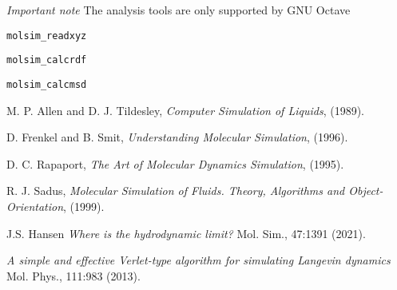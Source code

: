 \documentclass[11pt]{article}
\begin{document}
\textit{Important note} The analysis tools are only supported by GNU Octave


\noindent \verb!molsim_readxyz!

\noindent \verb!molsim_calcrdf!

\noindent \verb!molsim_calcmsd!

\noindent 

\fi

\clearpage

\begin{thebibliography}{9}

  M. P. Allen and D. J. Tildesley, \emph{Computer Simulation of Liquids}, (1989). 

  D. Frenkel and B. Smit, \emph{Understanding Molecular Simulation}, (1996).

 D. C. Rapaport, \emph{The Art of Molecular Dynamics Simulation}, (1995).

  R. J. Sadus, \emph{Molecular Simulation of Fluids. Theory, Algorithms and
    Object-Orientation}, (1999).

  J.S. Hansen \emph{Where is the hydrodynamic limit?} Mol. Sim., 47:1391 (2021).
 
   \emph{A simple and effective Verlet-type algorithm for simulating Langevin dynamics} 
   Mol. Phys., 111:983 (2013).
  
\end{thebibliography}

\appendix

\clearpage
\end{document}
